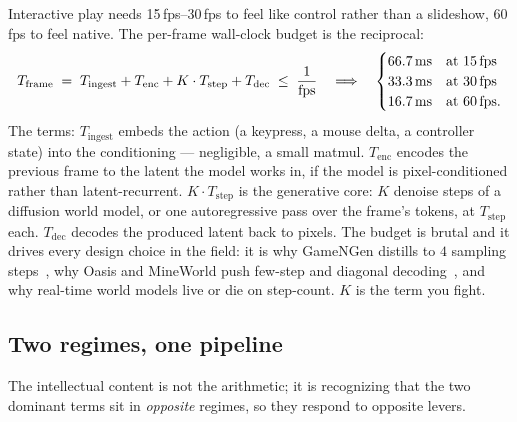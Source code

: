 \documentclass[11pt]{article}
\newcommand{\Tframe}{\ensuremath{T_{\mathrm{frame}}}}
\newcommand{\Tstep}{\ensuremath{T_{\mathrm{step}}}}
\newcommand{\Tenc}{\ensuremath{T_{\mathrm{enc}}}}
\newcommand{\Tdec}{\ensuremath{T_{\mathrm{dec}}}}
\newcommand{\fps}[1]{\mbox{#1\,fps}}
\begin{document}
Interactive play needs \fps{15}--\fps{30} to feel like control rather than a slideshow, \fps{60} to feel
native. The per-frame wall-clock budget is the reciprocal:
\begin{equation}
\Tframe \;=\; T_{\mathrm{ingest}} + \Tenc + K\cdot\Tstep + \Tdec \;\le\; \frac{1}{\text{fps}}
\quad\Longrightarrow\quad
\begin{cases}
66.7\,\text{ms} & \text{at \fps{15}}\\
33.3\,\text{ms} & \text{at \fps{30}}\\
16.7\,\text{ms} & \text{at \fps{60}.}
\end{cases}
\label{eq:budget}
\end{equation}
The terms: $T_{\mathrm{ingest}}$ embeds the action (a keypress, a mouse delta, a controller state) into the
conditioning --- negligible, a small matmul. $\Tenc$ encodes the previous frame to the latent the model works
in, if the model is pixel-conditioned rather than latent-recurrent. $K\cdot\Tstep$ is the generative core: $K$
denoise steps of a diffusion world model, or one autoregressive pass over the frame's tokens, at $\Tstep$
each. $\Tdec$ decodes the produced latent back to pixels. The budget is brutal and it drives every design
choice in the field: it is why GameNGen distills to $4$ sampling steps~\cite{gamengen}, why Oasis and
MineWorld push few-step and diagonal decoding~\cite{oasis,mineworld}, and why real-time world models live or
die on step-count. $K$ is the term you fight.

\subsection{Two regimes, one pipeline}
\label{sec:regimes}

The intellectual content is not the arithmetic; it is recognizing that the two dominant terms sit in
\emph{opposite} regimes, so they respond to opposite levers.
\end{document}
